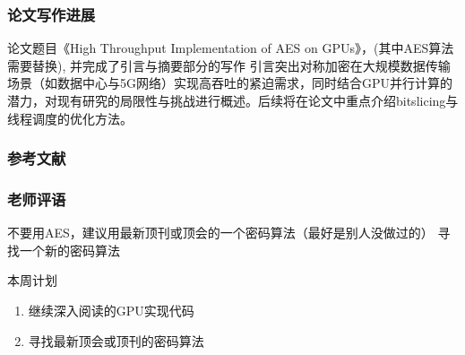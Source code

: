 \documentclass{beamer}
\begin{document}
\begin{frame}
    \frametitle{论文写作进展}
    \begin{block}{论文题目《High Throughput Implementation of AES on GPUs》，(其中AES算法需要替换), 并完成了引言与摘要部分的写作}
        引言突出对称加密在大规模数据传输场景（如数据中心与5G网络）实现高吞吐的紧迫需求，同时结合GPU并行计算的潜力，对现有研究的局限性与挑战进行概述。后续将在论文中重点介绍bitslicing与线程调度的优化方法。
    \end{block}
\end{frame}

\begin{frame}[allowframebreaks]
    \frametitle{参考文献}
    
\end{frame}

\begin{frame}
    \frametitle{老师评语}

    \begin{alertblock}{不要用AES，建议用最新顶刊或顶会的一个密码算法（最好是别人没做过的）}
        寻找一个新的密码算法
    \end{alertblock}
    \begin{block}{本周计划}
        \begin{enumerate}
            \item 继续深入阅读\cite{Lee2022}的GPU实现代码
            \item 寻找最新顶会或顶刊的密码算法
        \end{enumerate} 
    \end{block}
\end{frame}
\end{document}
